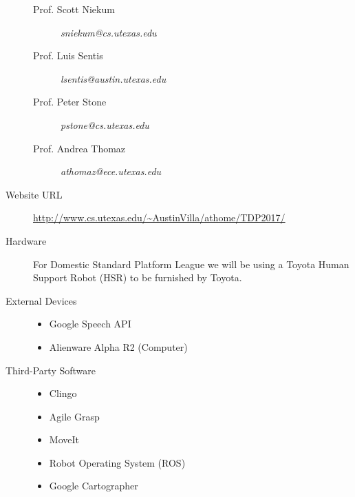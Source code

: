 \begin{description}
\begin{description}
\item[Prof. Scott Niekum] \textit{sniekum@cs.utexas.edu }
\item[Prof. Luis Sentis] \textit{lsentis@austin.utexas.edu }
\item[Prof. Peter Stone] \textit{pstone@cs.utexas.edu }
\item[Prof. Andrea Thomaz] \textit{athomaz@ece.utexas.edu}
\end{description}
\item[Website URL]\url{http://www.cs.utexas.edu/~AustinVilla/athome/TDP2017/}
\item[Hardware] For Domestic Standard Platform League we will be using a Toyota Human Support Robot (HSR) to be furnished by Toyota.
\item[External Devices] \hfill 
\begin{itemize}
\item Google Speech API
\item Alienware Alpha R2 (Computer)
\end{itemize}
\item[Third-Party Software] \hfill
\begin{itemize}
\item Clingo
\item Agile Grasp
\item MoveIt
\item Robot Operating System (ROS)
\item Google Cartographer
\end{itemize}
\end{description}
